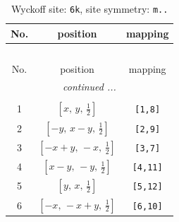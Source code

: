 \documentclass[fleqn,8pt]{jsarticle}
\begin{document}
\renewcommand{\arraystretch}{1.2}
\begin{longtable}{ccc}
\caption{Wyckoff site: {\tt 6k}, site symmetry: {\tt m..}}
 \\
 \hline \hline
No. & position & mapping \\ \hline \endfirsthead

\multicolumn{2}{l}{\tablename\ \thetable{}} \\
 \hline \hline
No. & position & mapping \\ \hline \endhead

 \hline \hline
\multicolumn{2}{r}{\footnotesize\it continued ...} \\ \endfoot

 \hline \hline
\multicolumn{2}{r}{} \\ \endlastfoot

1 & $\left[ x,\, y,\, \frac{1}{2} \right]$ & {\tt [1,8]} \\ \hline
2 & $\left[ - y,\, x - y,\, \frac{1}{2} \right]$ & {\tt [2,9]} \\ \hline
3 & $\left[ - x + y,\, - x,\, \frac{1}{2} \right]$ & {\tt [3,7]} \\ \hline
4 & $\left[ x - y,\, - y,\, \frac{1}{2} \right]$ & {\tt [4,11]} \\ \hline
5 & $\left[ y,\, x,\, \frac{1}{2} \right]$ & {\tt [5,12]} \\ \hline
6 & $\left[ - x,\, - x + y,\, \frac{1}{2} \right]$ & {\tt [6,10]} \\
\end{longtable}
\renewcommand{\arraystretch}{1.2}
\end{document}
